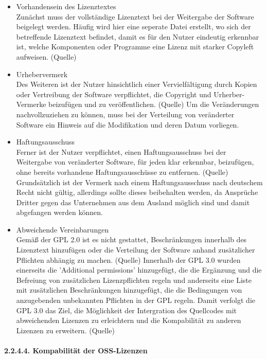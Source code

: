 \begin{itemize}
    \item Vorhandensein des Lizenztextes\\
    Zunächst muss der vollständige Lizenztext bei der Weitergabe der Software beigelegt werden. Häufig wird hier eine seperate Datei erstellt, wo sich der betreffende Lizenztext befindet, damit es für den Nutzer eindeutig erkennbar ist, welche Komponenten oder Programme eine Lizenz mit starker Copyleft aufweisen. (Quelle) 

    \item Urhebervermerk\\
    Des Weiteren ist der Nutzer hinsichtlich einer Vervielfältigung durch Kopien oder Vertreibung der Software verpflichtet, die Copyright und Urherber-Vermerke beizufügen und zu veröffentlichen. (Quelle) Um die Veränderungen nachvollzuziehen zu können, muss bei der Verteilung von veränderter Software ein Hinweis auf die Modifikation und deren Datum vorliegen. 
    
    \item Haftungsausschuss\\
    Ferner ist der Nutzer verpflichtet, einen Haftungsausschuss bei der Weitergabe von veränderter Software, für jeden klar erkennbar, beizufügen, ohne bereits vorhandene Haftungsausschüsse zu entfernen. (Quelle) Grundsätzlich ist der Vermerk nach einem Haftungsausschuss nach deutschem Recht nicht gültig, allerdings sollte dieses beibehalten werden, da Ansprüche Dritter gegen das Unternehmen aus dem Ausland möglich sind und damit abgefangen werden können.  

    \item Abweichende Vereinbarungen\\
    Gemäß der GPL 2.0 ist es nicht gestattet, Beschränkungen innerhalb des Lizenztext hinzufügen oder die Verteilung der Software anhand zusätzlicher Pflichten abhängig zu machen. (Quelle)  Innerhalb der GPL 3.0 wurden einerseits die 'Additional permissions' hinzugefügt, die die Ergänzung und die Befreiung von zusätzlichen Lizenzpflichten regeln und anderseits eine Liste mit zusätzlichen Beschränkungen hinzugefügt, die die Bedingungen von anzugebenden unbekannten Pflichten in der GPL regeln. Damit verfolgt die GPL 3.0 das Ziel, die Möglichkeit der Intergration des Quellcodes mit abweichenden Lizenzen zu erleichtern und die Kompabilität zu anderen Lizenzen zu erweitern. (Quelle)     
\end{itemize}

\paragraph{2.2.4.4. Kompabilität der OSS-Lizenzen}$~$

